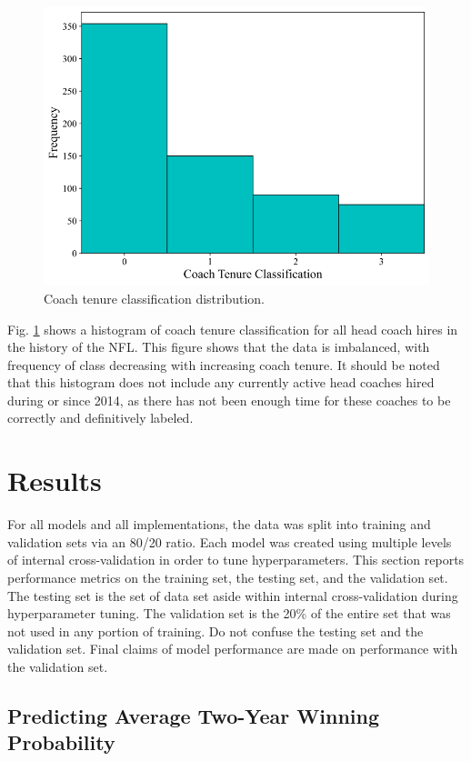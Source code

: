 \documentclass[conference]{IEEEtran}
\begin{document}
\begin{figure}[htbp]
\centerline{\includegraphics[width=1\linewidth]{hist2.png}}
\caption{Coach tenure classification distribution.}
\label{fig3}
\end{figure}

Fig. \ref{fig3} shows a histogram of coach tenure classification for all head coach hires in the history of the NFL. This figure shows that the data is imbalanced, with frequency of class decreasing with increasing coach tenure. It should be noted that this histogram does not include any currently active head coaches hired during or since 2014, as there has not been enough time for these coaches to be correctly and definitively labeled.

\section{Results}
For all models and all implementations, the data was split into training and validation sets via an 80/20 ratio. Each model was created using multiple levels of internal cross-validation in order to tune hyperparameters. This section reports performance metrics on the training set, the testing set, and the validation set. The testing set is the set of data set aside within internal cross-validation during hyperparameter tuning. The validation set is the 20\% of the entire set that was not used in any portion of training. Do not confuse the testing set and the validation set. Final claims of model performance are made on performance with the validation set.

\subsection{Predicting Average Two-Year Winning Probability}
\end{document}
